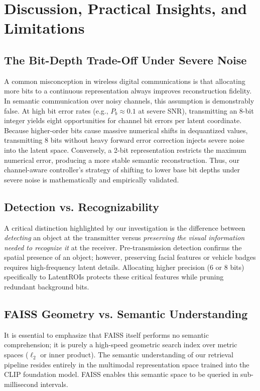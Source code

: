 \documentclass[journal,twocolumn]{IEEEtran}
\begin{document}
\section{Discussion, Practical Insights, and Limitations}
\subsection{The Bit-Depth Trade-Off Under Severe Noise}
A common misconception in wireless digital communications is that allocating more bits to a continuous representation always improves reconstruction fidelity. In semantic communication over noisy channels, this assumption is demonstrably false. At high bit error rates (e.g., $P_b \approx 0.1$ at severe SNR), transmitting an 8-bit integer yields eight opportunities for channel bit errors per latent coordinate. Because higher-order bits cause massive numerical shifts in dequantized values, transmitting 8 bits without heavy forward error correction injects severe noise into the latent space. Conversely, a 2-bit representation restricts the maximum numerical error, producing a more stable semantic reconstruction. Thus, our channel-aware controller's strategy of shifting to lower base bit depths under severe noise is mathematically and empirically validated.

\subsection{Detection vs. Recognizability}
A critical distinction highlighted by our investigation is the difference between \textit{detecting} an object at the transmitter versus \textit{preserving the visual information needed to recognize it} at the receiver. Pre-transmission detection confirms the spatial presence of an object; however, preserving facial features or vehicle badges requires high-frequency latent details. Allocating higher precision (6 or 8 bits) specifically to LatentROIs protects these critical features while pruning redundant background bits.

\subsection{FAISS Geometry vs. Semantic Understanding}
It is essential to emphasize that FAISS itself performs no semantic comprehension; it is purely a high-speed geometric search index over metric spaces ($\ell_2$ or inner product). The semantic understanding of our retrieval pipeline resides entirely in the multimodal representation space trained into the CLIP foundation model. FAISS enables this semantic space to be queried in sub-millisecond intervals.
\end{document}
